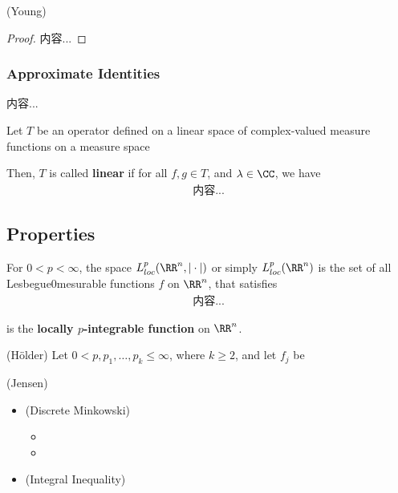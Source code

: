 \documentclass[Total.tex]{subfiles}
\begin{document}
			\begin{theorem}
				(Young)
			\end{theorem}
			\begin{proof}
				内容...
			\end{proof}
		\subsubsection{Approximate Identities}
			\begin{Def}
				内容...
			\end{Def}
			\begin{Def}
				Let $T$ be an operator defined on a linear space of complex-valued measure functions on a measure space
				
				Then, $T$ is called \textbf{linear} if for all $f,g\in T$, and $\lambda\in \CC$, we have
				\begin{gather*}
					内容...
				\end{gather*}
			\end{Def}
	\subsection{Properties}
	
	
	\begin{Def}
		For $0<p<\infty$, the space $L_{loc}^p(\RR^n,|\cdot|)$ or simply $L_{loc}^p(\RR^n)$ is the set of all Lesbegue0mesurable functions $f$ on $\RR^n$, that satisfies
		\begin{gather*}
			内容...
		\end{gather*}
		
		is the \textbf{locally $p$-integrable function} on $\RR^n$. 
	\end{Def}
	
	\begin{theorem}
		(H\"older) Let $0<p,p_1,\dots,p_k\leq \infty$, where $k\geq 2$, and let $f_j$ be 
	\end{theorem}
	
	\begin{theorem}
		(Jensen)
	\end{theorem}
	
	\begin{theorem}
		\begin{itemize}
			\item (Discrete Minkowski)
				\begin{itemize}
					\item 
					\item 
				\end{itemize}
			\item (Integral Inequality)
			
		\end{itemize}
	\end{theorem}
	
\end{document}
